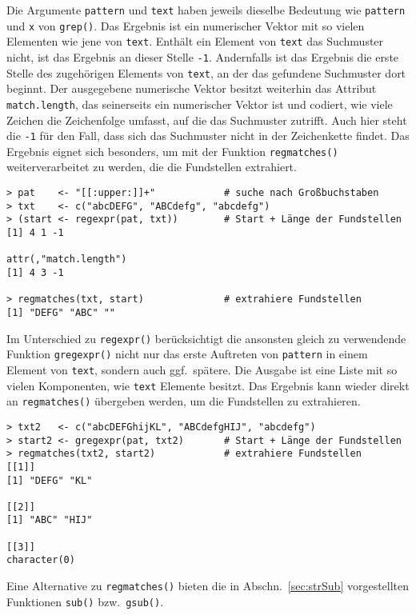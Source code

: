 Die Argumente \lstinline!pattern! und \lstinline!text! haben jeweils dieselbe Bedeutung wie \lstinline!pattern! und \lstinline!x! von \lstinline!grep()!. Das Ergebnis ist ein numerischer Vektor mit so vielen Elementen wie jene von \lstinline!text!. Enthält ein Element von \lstinline!text! das Suchmuster nicht, ist das Ergebnis an dieser Stelle \lstinline!-1!. Andernfalls ist das Ergebnis die erste Stelle des zugehörigen Elements von \lstinline!text!, an der das gefundene Suchmuster dort beginnt. Der ausgegebene numerische Vektor besitzt weiterhin das Attribut \lstinline!match.length!, das seinerseits ein numerischer Vektor ist und codiert, wie viele Zeichen die Zeichenfolge umfasst, auf die das Suchmuster zutrifft. Auch hier steht die \lstinline!-1! für den Fall, dass sich das Suchmuster nicht in der Zeichenkette findet. Das Ergebnis eignet sich besonders, um mit der Funktion \lstinline!regmatches()! weiterverarbeitet zu werden, die die Fundstellen extrahiert.
\begin{lstlisting}
> pat    <- "[[:upper:]]+"            # suche nach Großbuchstaben
> txt    <- c("abcDEFG", "ABCdefg", "abcdefg")
> (start <- regexpr(pat, txt))        # Start + Länge der Fundstellen
[1] 4 1 -1

attr(,"match.length")
[1] 4 3 -1

> regmatches(txt, start)              # extrahiere Fundstellen
[1] "DEFG" "ABC" ""
\end{lstlisting}

Im Unterschied zu \lstinline!regexpr()! berücksichtigt die ansonsten gleich zu verwendende Funktion \lstinline!gregexpr()! nicht nur das erste Auftreten von \lstinline!pattern! in einem Element von \lstinline!text!, sondern auch ggf.\ spätere. Die Ausgabe ist eine Liste mit so vielen Komponenten, wie \lstinline!text! Elemente besitzt. Das Ergebnis kann wieder direkt an \lstinline!regmatches()! übergeben werden, um die Fundstellen zu extrahieren.
\begin{lstlisting}
> txt2   <- c("abcDEFGhijKL", "ABCdefgHIJ", "abcdefg")
> start2 <- gregexpr(pat, txt2)       # Start + Länge der Fundstellen
> regmatches(txt2, start2)            # extrahiere Fundstellen
[[1]]
[1] "DEFG" "KL"  

[[2]]
[1] "ABC" "HIJ"

[[3]]
character(0)
\end{lstlisting}

Eine Alternative zu \lstinline!regmatches()! bieten die in Abschn.\ \ref{sec:strSub} vorgestellten Funktionen \lstinline!sub()! bzw.\ \lstinline!gsub()!.

